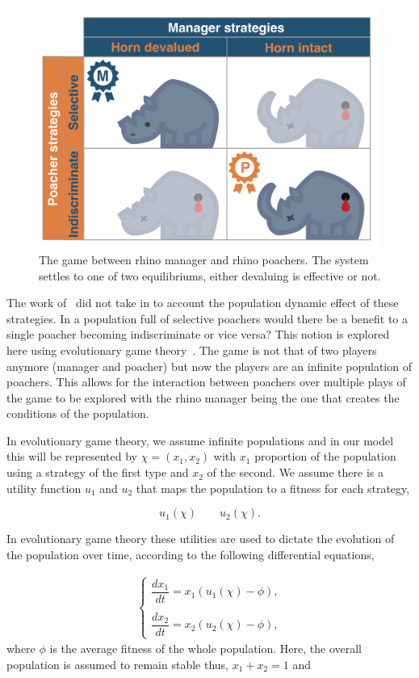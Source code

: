 \documentclass[10pt]{article}
\begin{document}
\begin{figure}[!htbp]
    \centering
    \includegraphics[scale=0.2]{images/RhinoPic.pdf}
    \caption{\label{fig:RhinoPic} The game between rhino manager and rhino 
    poachers. The system settles to one of two equilibriums, either devaluing is effective or not.}
\end{figure}

The work of~\cite{Lee} did not take in to account the population dynamic effect
of  these strategies. In a population full of selective poachers would there be 
a benefit to a single poacher becoming indiscriminate or vice versa? This notion 
is explored here using evolutionary game theory~\cite{Smith}. The 
game is not that of two players anymore (manager and poacher) but now the players
are an infinite population of poachers. This allows for the interaction between poachers
over multiple plays of the game to be explored with the rhino manager being the
one that creates the conditions of the population. 

In evolutionary game theory, we assume infinite populations and in our
model this will be represented by \(\chi=(x_1, x_2)\) with \(x_1\) proportion of the
population using a strategy of the first type and \(x_2\) of the second. We 
assume there is a utility function \(u_1\) and \(u_2\) that maps the population
to a fitness for each strategy,

\[ u_1(\chi)  \qquad u_2(\chi).\] 

In evolutionary game theory these utilities are used to dictate the evolution of
the population over time, according to the following differential equations,

\begin{eqnarray}
    \label{eqn:u_differential_eq}
    \left\{
    \begin{array}{cl}
    \dfrac{dx_1}{dt}=x_1(u_1(\chi)-\phi),
    \\
    \\
    \dfrac{dx_2}{dt}= x_2(u_2(\chi)-\phi),
    \end{array} \right.
\end{eqnarray}
where \(\phi\) is the average fitness of the whole population. Here, the overall 
population is assumed to remain stable thus, \(x_1 + x_2 = 1 \) and
\end{document}
